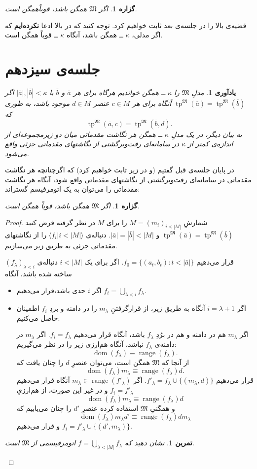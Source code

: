 \documentclass[12pt,a4paper]{article}
\theoremstyle{colorhead}
\newtheorem{tam}[thm]{تمرین}
\newtheorem{prop}[thm]{گزاره}
\newtheorem{yad}[thm]{یادآوری}
\DeclareMathOperator{\dom}{dom}
\DeclareMathOperator{\range}{range}
\DeclareMathOperator{\tp}{tp}
\begin{document}
\begin{prop}
اگر
$\mathfrak{M}$
همگن باشد، قویاًهمگن است.
\end{prop}
قضیه‌ی بالا را در جلسه‌ی بعد ثابت خواهیم کرد. توجه کنید که در بالا ادعا\textbf{ نکرده‌ایم} که اگر
مدلی،
$\kappa$ ــ
همگن باشد، آنگاه
$\kappa$ 
ــ 
قویاً همگن است. 
\newpage
\section{جلسه‌ی سیزدهم}
\begin{yad}
مدلِ
$\mathfrak{M}$
را
$\kappa$
ــ
همگن خواندیم هرگاه برای هر
$\bar{a}$
و
$\bar{b}$
با
$|\bar{a}|, |\bar{b}|<\kappa$
اگر
\mbox{$\tp^\mathfrak{M}(\bar{a})=\tp^\mathfrak{M}(\bar{b})$}
آنگاه برای هر
$c\in M$
عنصر
$d\in M$
موجود باشد، به طوری که
\[\tp^\mathfrak{M}(\bar{a},c)=\tp^\mathfrak{M}(\bar{b},d).\]
به بیان دیگر، در یک مدلِ
$\kappa$
ــ
همگن هر نگاشت مقدماتی میان دو زیرمجموعه‌ای از اندازه‌ی کمتر از
$\kappa$
در سامانه‌ای رفت‌وبرگشتی  از نگاشتهای مقدماتی جزئی واقع می‌شود.
\end{yad}
در پایان جلسه‌ی قبل گفتیم (و در زیر ثابت خواهیم کرد)‌ که اگرچنانچه هر نگاشت مقدماتی
در سامانه‌ای رفت‌وبرگشتی از نگاشتهای مقدماتی واقع شود، آنگاه هر نگاشت مقدماتی را می‌توان به یک اتومرفیسم گستراند:
\begin{prop}
اگر
$\mathfrak{M}$
همگن باشد، قویاً همگن است.
\end{prop}
\begin{proof}
شمارشِ
$M=(m_i)_{i< |M|}$
را برای 
$M$
در نظر گرفته فرض کنید
$\tp^\mathfrak{M}(\bar{a})=\tp^\mathfrak{M}(\bar{b})$
و
$|\bar{a}|=|\bar{b}|<|M|$.
دنباله‌ی
$\langle f_i|i<|M|\rangle$
را
از نگاشتهای مقدماتی جزئی  به طریق زیر می‌سازیم. 
\par 
قرار می‌دهیم
$f_0=\{(a_t,b_t):{t<|\bar{a}|}\}$.
اگر
برای یک
$i<|M|$
دنباله‌ی
$(f_\lambda)_{\lambda<i}$
ساخته شده باشد، آنگاه
\begin{itemize}
\item 
 اگر
 $i$
 حدی باشد،‌قرار می‌دهیم
 $f_i=\bigcup_{\lambda<i} f_\lambda$.
 \item 
 اگر
 $i=\lambda+1$
 آنگاه
 به طریق زیر، از قرارگرفتنِ
 $m_\lambda$
 را در دامنه و 
 بردِ
 $f_i$
 اطمینان حاصل می‌کنیم:
 \par 
اگر
 $m_\lambda$
 هم در دامنه و هم در برُدِ
 $f_\lambda$
 باشد،
 آنگاه قرار می‌دهیم 
 $f_{i}=f_\lambda$.
 اگر
 $m_\lambda$
 در دامنه‌ی
 $f_\lambda$
 نباشد، آنگاه هم‌ارزی زیر را در نظر می‌گیریم:
 \[
 \dom(f_\lambda)\equiv \range (f_\lambda).
 \]
 از آنجا که
 $\mathfrak{M}$
 همگن است، می‌توان عنصرِ
 $d$
 را چنان یافت که
 \[
 \dom(f_\lambda)m_\lambda\equiv \range (f_\lambda)d.
 \]
 قرار می‌دهیم
 $f'_\lambda=f_\lambda\cup \{(m_\lambda,d)\}$.
 اگر
 $m_\lambda\in \range (f'_\lambda)$
 آنگاه قرار می‌دهیم
 $f_{i}=f'_\lambda$
 و در غیر این صورت، از هم‌ارزیِ
 \[
 \dom(f_\lambda)m_\lambda\equiv \range (f_\lambda) d
 \]
 و همگنیِ
 $\mathfrak{M}$
 استفاده کرده عنصرِ
 $d'$
 را چنان می‌یابیم که 
 \[
  \dom(f_\lambda)m_\lambda d'\equiv \range (f_\lambda) dm_\lambda
 \]
 و قرار می‌دهیم
 $f_i=f'_\lambda\cup \{(d',m_\lambda)\}$.
\end{itemize}
\begin{tam}
نشان دهید که 
$f=\bigcup_{\lambda<|M|} f_\lambda$
اتومرفیسمی از 
$\mathfrak{M}$
است.
\end{tam}
\end{proof}
\end{document}
